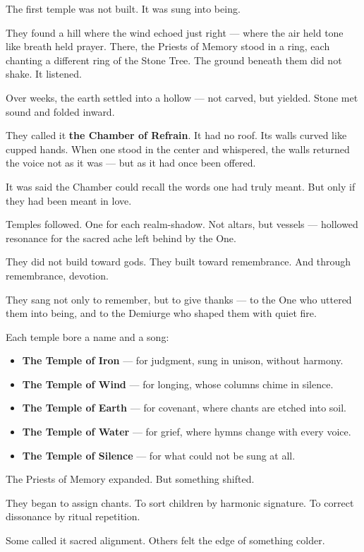 \documentclass[10pt]{article}
\begin{document}
The first temple was not built.  
It was sung into being.

They found a hill where the wind echoed just right —  
where the air held tone like breath held prayer.  
There, the Priests of Memory stood in a ring, each chanting a different ring of the Stone Tree.  
The ground beneath them did not shake.  
It listened.

Over weeks, the earth settled into a hollow — not carved, but yielded.  
Stone met sound and folded inward.

They called it \textbf{the Chamber of Refrain}.  
It had no roof.  
Its walls curved like cupped hands.  
When one stood in the center and whispered,  
the walls returned the voice not as it was —  
but as it had once been offered.

It was said the Chamber could recall the words one had truly meant.  
But only if they had been meant in love.

Temples followed.  
One for each realm-shadow.  
Not altars, but vessels —  
hollowed resonance for the sacred ache left behind by the One.

They did not build toward gods.  
They built toward remembrance.  
And through remembrance, devotion.

They sang not only to remember,  
but to give thanks —  
to the One who uttered them into being,  
and to the Demiurge who shaped them with quiet fire.

Each temple bore a name and a song:

\begin{itemize}
\item \textbf{The Temple of Iron} — for judgment, sung in unison, without harmony.
\item \textbf{The Temple of Wind} — for longing, whose columns chime in silence.
\item \textbf{The Temple of Earth} — for covenant, where chants are etched into soil.
\item \textbf{The Temple of Water} — for grief, where hymns change with every voice.
\item \textbf{The Temple of Silence} — for what could not be sung at all.
\end{itemize}

The Priests of Memory expanded.  
But something shifted.

They began to assign chants.  
To sort children by harmonic signature.  
To correct dissonance by ritual repetition.

Some called it sacred alignment.  
Others felt the edge of something colder.
\end{document}
